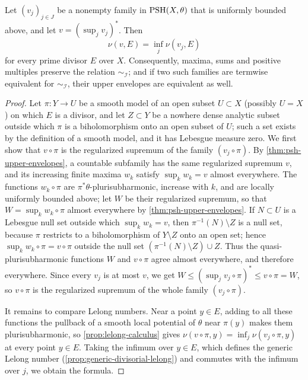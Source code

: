 \begin{lemma}\label{lem:divisorial-envelope-closure}
Let $(v_j)_{j\in J}$ be a nonempty family in $\mathrm{PSH}(X,\theta)$ that is uniformly bounded above, and let $v=(\sup_jv_j)^*$. Then
\[
 \nu(v,E)=\inf_j\nu(v_j,E)
\]
for every prime divisor $E$ over $X$. Consequently, maxima, sums and positive multiples preserve the relation $\sim_{\mathcal I}$; and if two such families are termwise equivalent for $\sim_{\mathcal I}$, their upper envelopes are equivalent as well.
\end{lemma}
\begin{proof}
Let $\pi\colon Y\to U$ be a smooth model of an open subset $U\subset X$ (possibly $U=X$) on which $E$ is a divisor, and let $Z\subset Y$ be a nowhere dense analytic subset outside which $\pi$ is a biholomorphism onto an open subset of $U$; such a set exists by the definition of a smooth model, and it has Lebesgue measure zero. We first show that $v\circ\pi$ is the regularized supremum of the family $(v_j\circ\pi)$. By \cref{thm:psh-upper-envelopes}, a countable subfamily has the same regularized supremum $v$, and its increasing finite maxima $w_k$ satisfy $\sup_kw_k=v$ almost everywhere. The functions $w_k\circ\pi$ are $\pi^*\theta$-plurisubharmonic, increase with $k$, and are locally uniformly bounded above; let $W$ be their regularized supremum, so that $W=\sup_kw_k\circ\pi$ almost everywhere by \cref{thm:psh-upper-envelopes}. If $N\subset U$ is a Lebesgue null set outside which $\sup_kw_k=v$, then $\pi^{-1}(N)\setminus Z$ is a null set, because $\pi$ restricts to a biholomorphism of $Y\setminus Z$ onto an open set; hence $\sup_kw_k\circ\pi=v\circ\pi$ outside the null set $(\pi^{-1}(N)\setminus Z)\cup Z$. Thus the quasi-plurisubharmonic functions $W$ and $v\circ\pi$ agree almost everywhere, and therefore everywhere. Since every $v_j$ is at most $v$, we get $W\leq(\sup_jv_j\circ\pi)^*\leq v\circ\pi=W$, so $v\circ\pi$ is the regularized supremum of the whole family $(v_j\circ\pi)$.

It remains to compare Lelong numbers. Near a point $y\in E$, adding to all these functions the pullback of a smooth local potential of $\theta$ near $\pi(y)$ makes them plurisubharmonic, so \cref{prop:lelong-calculus} gives $\nu(v\circ\pi,y)=\inf_j\nu(v_j\circ\pi,y)$ at every point $y\in E$. Taking the infimum over $y\in E$, which defines the generic Lelong number (\cref{prop:generic-divisorial-lelong}) and commutes with the infimum over $j$, we obtain the formula.


\end{proof}
